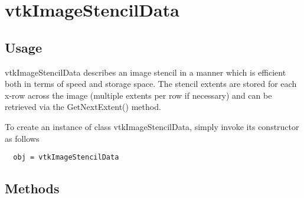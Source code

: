 \section{vtkImageStencilData}

\subsection{Usage}

 vtkImageStencilData describes an image stencil in a manner which is
 efficient both in terms of speed and storage space.  The stencil extents
 are stored for each x-row across the image (multiple extents per row if
 necessary) and can be retrieved via the GetNextExtent() method.

To create an instance of class vtkImageStencilData, simply
invoke its constructor as follows
\begin{verbatim}
  obj = vtkImageStencilData
\end{verbatim}
\subsection{Methods}

